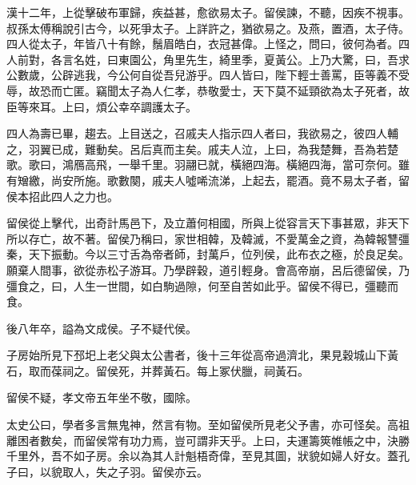 漢十二年，上從擊破布軍歸，疾益甚，愈欲易太子。留侯諫，不聽，因疾不視事。叔孫太傅稱說引古今，以死爭太子。上詳許之，猶欲易之。及燕，置酒，太子侍。四人從太子，年皆八十有餘，鬚眉皓白，衣冠甚偉。上怪之，問曰，彼何為者。四人前對，各言名姓，曰東園公，角里先生，綺里季，夏黃公。上乃大驚，曰，吾求公數歲，公辟逃我，今公何自從吾兒游乎。四人皆曰，陛下輕士善罵，臣等義不受辱，故恐而亡匿。竊聞太子為人仁孝，恭敬愛士，天下莫不延頸欲為太子死者，故臣等來耳。上曰，煩公幸卒調護太子。

四人為壽已畢，趨去。上目送之，召戚夫人指示四人者曰，我欲易之，彼四人輔之，羽翼已成，難動矣。呂后真而主矣。戚夫人泣，上曰，為我楚舞，吾為若楚歌。歌曰，鴻鴈高飛，一舉千里。羽翮已就，橫絕四海。橫絕四海，當可奈何。雖有矰繳，尚安所施。歌數闋，戚夫人噓唏流涕，上起去，罷酒。竟不易太子者，留侯本招此四人之力也。

留侯從上擊代，出奇計馬邑下，及立蕭何相國，所與上從容言天下事甚眾，非天下所以存亡，故不著。留侯乃稱曰，家世相韓，及韓滅，不愛萬金之資，為韓報讐彊秦，天下振動。今以三寸舌為帝者師，封萬戶，位列侯，此布衣之極，於良足矣。願棄人間事，欲從赤松子游耳。乃學辟穀，道引輕身。會高帝崩，呂后德留侯，乃彊食之，曰，人生一世間，如白駒過隙，何至自苦如此乎。留侯不得已，彊聽而食。

後八年卒，謚為文成侯。子不疑代侯。

子房始所見下邳圯上老父與太公書者，後十三年從高帝過濟北，果見穀城山下黃石，取而葆祠之。留侯死，并葬黃石。每上冢伏臘，祠黃石。

留侯不疑，孝文帝五年坐不敬，國除。

太史公曰，學者多言無鬼神，然言有物。至如留侯所見老父予書，亦可怪矣。高祖離困者數矣，而留侯常有功力焉，豈可謂非天乎。上曰，夫運籌筴帷帳之中，決勝千里外，吾不如子房。余以為其人計魁梧奇偉，至見其圖，狀貌如婦人好女。蓋孔子曰，以貌取人，失之子羽。留侯亦云。